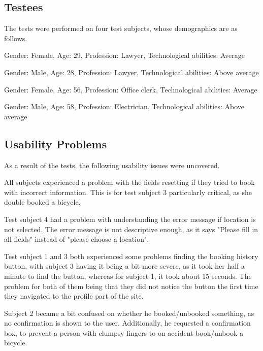 \subsection{Testees}
The tests were performed on four test subjects, whose demographics are as follows.
\begin{description}[style=nextline]
\item[Subject 1]
Gender: Female, Age: 29, Profession: Lawyer, Technological abilities: Average
\item[Subject 2]
Gender: Male, Age: 28, Profession: Lawyer, Technological abilities: Above average
\item[Subject 3]
Gender: Female, Age: 56, Profession: Office clerk, Technological abilities: Average
\item[Subject 4]
Gender: Male, Age: 58, Profession: Electrician, Technological abilities: Above average
\end{description}

\subsection{Usability Problems}
As a result of the tests, the following usability issues were uncovered.

\begin{description}[style=nextline]
	\item[{\#}1 Fields reset]
		All subjects experienced a problem with the fields resetting if they tried to book with incorrect information.
		This is for test subject 3 particularly critical, as she double booked a bicycle.
	\item[{\#}2 Error message understandability] Test subject 4 had a problem with understanding the error message if location is not selected.
												The error message is not descriptive enough, as it says "Please fill in all fields" instead of "please choose a location".
	\item[{\#}3 Difficulty finding history] Test subject 1 and 3 both experienced some problems finding the booking history button, with subject 3 having it being a bit more severe, as it took her half a minute to find the button, whereas for subject 1, it took about 15 seconds. The problem for both of them being that they did not notice the button the first time they navigated to the profile part of the site.
	\item[{\#}4 Booking/Unbooking confirmation] Subject 2 became a bit confused on whether he booked/unbooked something, as no confirmation is shown to the user.
												Additionally, he requested a confirmation box, to prevent a person with clumpsy fingers to on accident book/unbook a bicycle.
\end{description}

